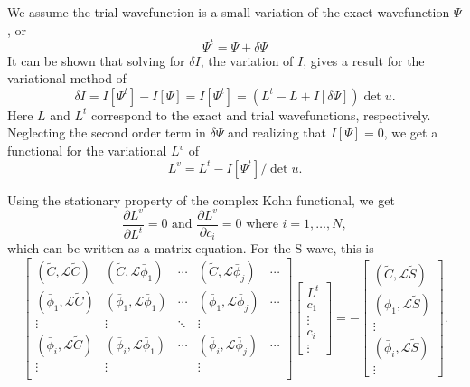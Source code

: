 \documentclass[preprint,showpacs,preprintnumbers,amsmath,amssymb]{revtex4}
\newcommand{\beq}{\begin{equation}}
\newcommand{\eeq}{\end{equation}}
\begin{document}
We assume the trial wavefunction is a small variation of the exact wavefunction $\Psi$, or
\beq
\Psi^t = \Psi + \delta \Psi
\label{eq:PsiTrialRelation}
\eeq
It can be shown that solving for $\delta I$, the variation of $I$, gives a result for the variational method of
\beq
\delta I = I[\Psi^t] - I[\Psi] = I[\Psi^t] = (L^t - L + I[\delta \Psi]) \det u.
\label{eq:IlPsiVariation}
\eeq
Here $L$ and $L^t$ correspond to the exact and trial wavefunctions, respectively. Neglecting the second order term in $\delta \Psi$ and realizing that $I[\Psi] = 0$, we get a functional for the variational $L^v$ of
\beq
L^v = L^t - I[\Psi^t] / \det u.
\label{eq:ComplexKohnVariation}
\eeq

Using the stationary property of the complex Kohn functional, we get
\beq
\frac{\partial L^v}{\partial L^t} = 0  \text{ and } \frac{\partial L^v}{\partial c_i} = 0 \text{ where $i = 1,\ldots,N$},
\label{eq:ComplexKohnStationary}
\eeq
which can be written as a matrix equation. For the S-wave, this is
\begin{equation}
\label{eq:ComplexKohnMatrix}
\begin{bmatrix} 
 (\widetilde{C},\mathcal{L}\widetilde{C}) & (\widetilde{C},\mathcal{L}\bar{\phi}_1) & \cdots & (\widetilde{C},\mathcal{L}\bar{\phi}_j) & \cdots\\
 (\bar{\phi}_1,\mathcal{L}\widetilde{C}) & (\bar{\phi}_1,\mathcal{L}\bar{\phi}_1) & \cdots & (\bar{\phi}_1,\mathcal{L}\bar{\phi}_j) & \cdots\\
 \vdots & \vdots & \ddots & \vdots \\
 (\bar{\phi}_i,\mathcal{L}\widetilde{C}) & (\bar{\phi}_i,\mathcal{L}\bar{\phi}_1) & \cdots & (\bar{\phi}_i,\mathcal{L}\bar{\phi}_j) & \cdots\\
 \vdots & \vdots & & \vdots & \\
\end{bmatrix}
\begin{bmatrix}
L^t\\
c_1\\
\vdots\\
c_i\\
\vdots
\end{bmatrix}
= -
\begin{bmatrix}
(\widetilde{C},\mathcal{L}\widetilde{S}) \\
(\bar{\phi}_1,\mathcal{L}\widetilde{S}) \\
\vdots \\
(\bar{\phi}_i,\mathcal{L}\widetilde{S}) \\
\vdots
\end{bmatrix}.
\end{equation}
\end{document}
